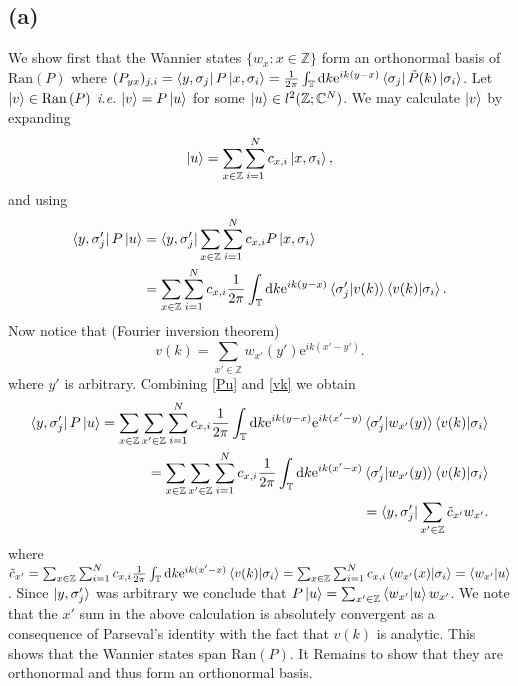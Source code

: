 \documentclass[a4paper,11pt]{article}
\newcommand{\euler}[1]{\text{e}^{#1}}
\newcommand{\Ran}[1]{\text{Ran}\left(#1\right)}
\newcommand*\diff{\mathop{}\!\mathrm{d}}
\newcommand{\ie}{\emph{i.e.} }
\newcommand{\C}{\mathbb{C}}
\newcommand{\Z}{\mathbb{Z}}
\numberwithin{equation}{section}
\begin{document}
 	 \subsection*{(a)} We show first that the Wannier states $ \{w_x : x\in\Z \}$ form an orthonormal basis of $ \Ran{P} $ where $ (P_{yx})_{j,i}=\bra{y,\sigma_j}P\ket{x,\sigma_i}=\frac{1}{2\pi}\int_\mathbb{T} \diff k \euler{ik(y-x)}\bra{\sigma_j}\tilde{P}(k)\ket{\sigma_i}$. Let $ \ket{v}\in\Ran{P} $ \ie $ \ket{v}=P\ket{u} $ for some $ \ket{u}\in l^2(\Z;\C^N) $. We may calculate $\ket{v}$ by expanding\begin{equation}
 	 \ket{u}=\sum_{x\in\Z}\sum_{i=1}^{N}c_{x,i}\ket{x,\sigma_i},
 	 \end{equation} 
 	 and using\begin{equation}
 	 \begin{aligned}
 	 \bra{y,\sigma_j'}P\ket{u}&=\bra{y,\sigma_j'}\sum_{x\in\Z}\sum_{i=1}^{N}c_{x,i}P\ket{x,\sigma_i}\\&=\sum_{x\in\Z}\sum_{i=1}^{N}c_{x,i}\frac{1}{2\pi}\int_\mathbb{T}\diff k \euler{ik(y-x)}\braket{\sigma_j'|v(k)}\braket{v(k)|\sigma_i}.\label{Pu}
 	 \end{aligned}
 	 \end{equation}
 	 Now notice that (Fourier inversion theorem) \begin{equation}
 	 v(k)=\sum_{x'\in\Z}w_{x'}(y')\euler{ik(x'-y')}. \label{vk}
 	 \end{equation}
 	 where $ y' $ is arbitrary.
 	 Combining \eqref{Pu} and \eqref{vk} we obtain\begin{equation}
 	 \begin{aligned}
 	 \bra{y,\sigma_j'}P\ket{u}=\sum_{x\in\Z}\sum_{x'\in\Z}\sum_{i=1}^{N}c_{x,i}\frac{1}{2\pi}\int_\mathbb{T}\diff k \euler{ik(y-x)}\euler{ik(x'-y)}\braket{\sigma_j'|w_{x'}(y)}\braket{v(k)|\sigma_i}\\
 	 =\sum_{x\in\Z}\sum_{x'\in\Z}\sum_{i=1}^{N}c_{x,i}\frac{1}{2\pi}\int_\mathbb{T}\diff k \euler{ik(x'-x)}\braket{\sigma_j'|w_{x'}(y)}\braket{v(k)|\sigma_i}\\
 	 =\bra{y,\sigma_j'}\sum_{x'\in\Z} \tilde{c}_{x'}w_{x'}.
 	 \end{aligned}
 	 \end{equation}
 	 where $ \tilde{c}_{x'}=\sum_{x\in\Z}\sum_{i=1}^{N}c_{x,i}\frac{1}{2\pi}\int_{\mathbb{T}}\diff k \euler{ik(x'-x)}\braket{v(k)|\sigma_i}=\sum_{x\in\Z}\sum_{i=1}^{N}c_{x,i}\braket{w_{x'}(x)|\sigma_i}=\braket{w_{x'}|u}$. Since $ \ket{y,\sigma_j'} $ was arbitrary we conclude that $ P\ket{u}=\sum_{x'\in\Z} \braket{w_{x'}|u}w_{x'} $. We note that the $ x' $ sum in the above calculation is absolutely convergent as a consequence of Parseval's identity with the fact that $ v(k) $ is analytic. This shows that the Wannier states span $ \Ran{P} $. It Remains to show that they are orthonormal and thus form an orthonormal basis.\\
\end{document}
